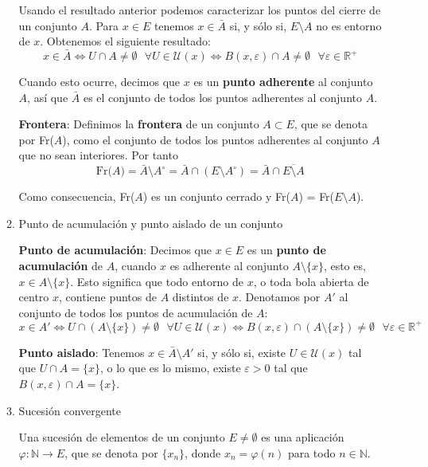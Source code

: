 \documentclass[a4paper, 12pt]{article}
\begin{document}
\begin{enumerate}[label=\textbf{\arabic*}.]
\begin{enumerate}[label=\textit{\alph*})]
Usando el resultado anterior podemos caracterizar los puntos del cierre de un conjunto \(A\). Para \(x \in E\) tenemos \(x \in \bar{A}\) si, y sólo si, \(E \setminus A\) no es entorno de \(x\). Obtenemos el siguiente resultado:
\[
	x \in \bar{A} \Longleftrightarrow U \cap A \neq  \emptyset \text{ } \forall U \in \mathcal{U}(x) \Longleftrightarrow B(x, \varepsilon) \cap A \neq \emptyset \text{ } \forall \varepsilon \in \mathbb{R}^+
\]

Cuando esto ocurre, decimos que \(x\) es un \textbf{punto adherente} al conjunto \(A\), así que \(\bar{A}\) es el conjunto de todos los puntos adherentes al conjunto \(A\).

\medskip

\textbf{Frontera}: Definimos la \textbf{frontera} de un conjunto \(A \subset E\), que se denota por Fr(\(A\)), como el conjunto de todos los puntos adherentes al conjunto \(A\) que no sean interiores. Por tanto
\[
	\text{Fr(}A) = \bar{A} \setminus A^{\circ} = \bar{A} \cap (E\setminus A^{\circ}) = \bar{A} \cap \overline{E \setminus A}
\]

Como consecuencia, Fr(\(A\)) es un conjunto cerrado y Fr(\(A\)) = Fr(\(E \setminus A\)).

\bigskip

	\item Punto de acumulación y punto aislado de un conjunto

\textbf{Punto de acumulación}: Decimos que \(x \in E\) es un \textbf{punto de acumulación} de \(A\), cuando \(x\) es adherente al conjunto \(A \setminus \{x\}\), esto es, \(x \in A \setminus \{x\}\). Esto significa que todo entorno de \(x\), o toda bola abierta de centro \(x\), contiene puntos de \(A\) distintos de \(x\). Denotamos por \(A'\) al conjunto de todos los puntos de acumulación  de \(A\):
\[
	x \in A' \Longleftrightarrow U \cap (A \setminus \{x\}) \neq \emptyset \text{ } \forall U \in \mathcal{U}(x) \Longleftrightarrow B(x, \varepsilon) \cap (A \setminus \{x\}) \neq \emptyset \text{ } \forall \varepsilon \in \mathbb{R}^+
\]

\textbf{Punto aislado}: Tenemos \(x \in \bar{A} \setminus A'\) si, y sólo si, existe \(U \in \mathcal{U}(x)\) tal que \(U \cap A = \{x\}\), o lo que es lo mismo, existe \(\varepsilon > 0\) tal que \(B(x, \varepsilon) \cap A = \{x\}\).

\bigskip

	\item Sucesión convergente

Una sucesión de elementos de un conjunto \(E \neq \emptyset\) es una aplicación \(\varphi : \mathbb{N} \rightarrow E\), que se denota por \(\{x_n\}\), donde \(x_n = \varphi (n)\) para todo \(n \in \mathbb{N}\). 


\end{enumerate}
\end{enumerate}
\end{document}
